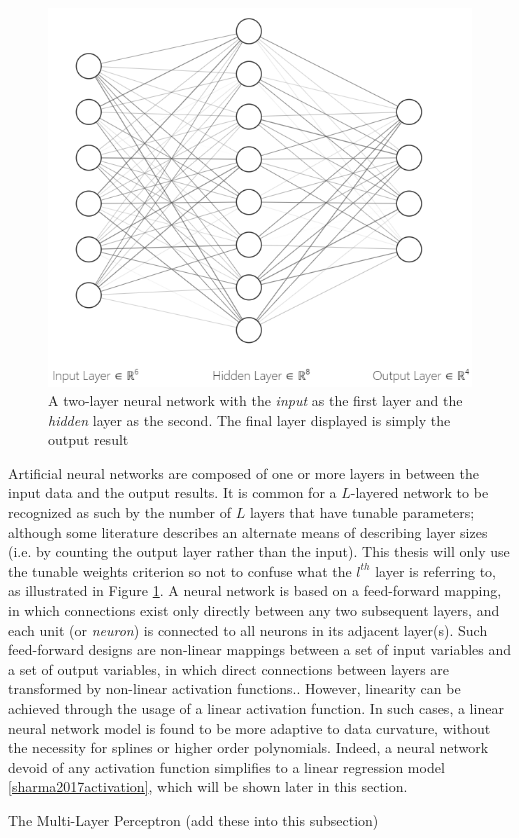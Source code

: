 

\begin{figure}
  \vspace{-50pt}
    \centering
    \includegraphics[width=.4\textwidth]{Figures/NN_int.png}
    \caption{\footnotesize{A two-layer neural network with the \emph{input} as the first layer and the \emph{hidden} layer as the second.  The final layer displayed is simply the output result}}
  \label{NNet}
  \vspace{-20pt}
\end{figure}

Artificial neural networks are composed of one or more layers in between the input data and the output results.  It is common for a $L$-layered network to be recognized as such by the number of $L$ layers that have tunable parameters; although some literature describes an alternate means of describing layer sizes \cite{bishop1995} (i.e. by counting the output layer rather than the input).  This thesis will only use the tunable weights criterion so not to confuse what the $l^{th}$ layer is referring to, as illustrated in Figure \ref{NNet}.  
A neural network is based on a feed-forward mapping, in which connections exist only directly between any two subsequent layers, and each unit (or \textit{neuron}) is connected to all neurons in its adjacent layer(s).  Such feed-forward designs are non-linear mappings between a set of input variables and a set of output variables, in which direct connections between layers are transformed by non-linear activation functions.\cite{bishop2006pattern}.
However, linearity can be achieved through the usage of a linear activation function.  In such cases, a linear neural network model is found to be more adaptive to data curvature, without the necessity for splines or higher order polynomials. \cite{?}
Indeed, a neural network devoid of any activation function simplifies to a linear regression model \ref{sharma2017activation}, which will be shown later in this section.


The Multi-Layer Perceptron (add these into this subsection)

